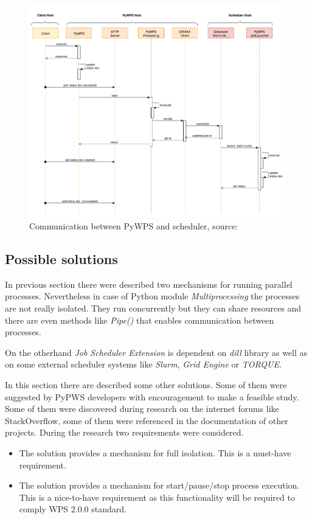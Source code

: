 \documentclass[12pt,a4paper]{article}
\begin{document}
\begin{figure}[h!]
\centering
\includegraphics[width=\textwidth]{img/Isolation_interaction.png}
\caption{Communication between PyWPS and scheduler, source: \cite{PyWPS_docs}}
\label{fig:Isolation_interaction}
\end{figure}

\subsection{Possible solutions}
In previous section there were described two mechanisms for running parallel processes. Nevertheless in case of Python module
\textit{Multiprocessing} the processes are not really isolated. They run concurrently but they can share resources and there are 
even methods like \textit{Pipe()} that enables communication between processes.

On the otherhand \textit{Job Scheduler Extension} is dependent on \textit{dill} library as well as on some external scheduler
systems like \textit{Slurm}, \textit{Grid Engine} or \textit{TORQUE}.

\bigskip
In this section there are described some other solutions. Some of them were suggested by PyPWS developers with encouragement to
make a feasible study. Some of them were discovered during research on the internet forums like StackOverflow, some of them
were referenced in the documentation of other projects. During the research two requirements were considered.

\begin{itemize}
\item The solution provides a mechanism for full isolation. This is a must-have requirement.
\item The solution provides a mechanism for start/pause/stop process execution. This is a nice-to-have requirement as this functionality
will be required to comply WPS 2.0.0 standard.
\end{itemize}
\end{document}
